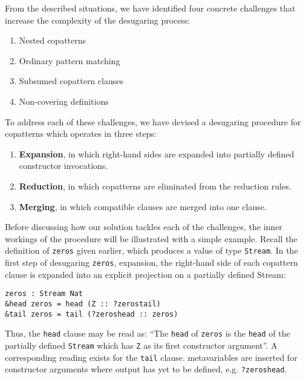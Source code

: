 From the described situations, we have identified four concrete challenges that
increase the complexity of the desugaring process:

\begin{enumerate}
\item Nested copatterns
\item Ordinary pattern matching
\item Subsumed copattern clauses
\item Non-covering definitions
\end{enumerate}

To address each of these challenges, we have devised a desugaring procedure for
copatterns which operates in three steps:

\begin{enumerate}
\item \textbf{Expansion}, in which right-hand sides are expanded into partially
  defined constructor invocations.
\item \textbf{Reduction}, in which copatterns are eliminated from the reduction rules.
\item \textbf{Merging}, in which compatible clauses are merged into one clause.
\end{enumerate}

Before discussing how our solution tackles each of the challenges, the inner
workings of the procedure will be illustrated with a simple example. Recall the
definition of \texttt{zeros} given earlier, which produces a value of type
\texttt{Stream}. In the first step
of desugaring \texttt{zeros}, expansion, the right-hand side of each copattern
clause is expanded into an explicit projection on a partially defined
Stream:
\begin{lstlisting}[mathescape]
zeros : Stream Nat
&head zeros = head (Z :: ?zerostail)
&tail zeros = tail (?zeroshead :: zeros)
\end{lstlisting}
Thus, the \texttt{head} clause may be read as: ``The \texttt{head} of
\texttt{zeros} is the \texttt{head} of the partially defined \texttt{Stream}
which has \texttt{Z} as its first constructor argument''. A corresponding
reading exists for the \texttt{tail} clause. \IdrisM{} metavariables are
inserted for constructor arguments where output has yet to be defined,
e.g. \texttt{?zeroshead}.


